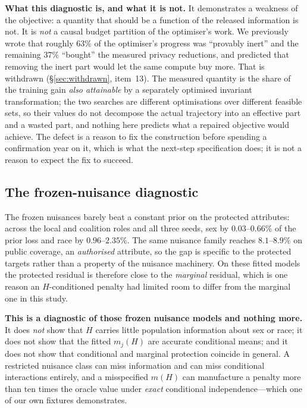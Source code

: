 \documentclass[10pt]{article}
\begin{document}
\textbf{What this diagnostic is, and what it is not.} It demonstrates a weakness of the objective:
a quantity that should be a function of the released information is not. It is \emph{not} a causal
budget partition of the optimiser's work. We previously wrote that roughly 63\% of the optimiser's
progress was ``provably inert'' and the remaining 37\% ``bought'' the measured privacy reductions,
and predicted that removing the inert part would let the same compute buy more. That is withdrawn
(\S\ref{sec:withdrawn}, item~13). The measured quantity is the share of the training gain
\emph{also attainable} by a separately optimised invariant transformation; the two searches are
different optimisations over different feasible sets, so their values do not decompose the actual
trajectory into an effective part and a wasted part, and nothing here predicts what a repaired
objective would achieve. The defect is a reason to fix the construction before spending a
confirmation year on it, which is what the next-step specification does; it is not a reason to
expect the fix to succeed.

\subsection{The frozen-nuisance diagnostic}

The frozen nuisances barely beat a constant prior on the protected attributes: across the local and
coalition roles and all three seeds, sex by $0.03$--$0.66\%$ of the prior loss and race by
$0.96$--$2.35\%$. The same nuisance family reaches $8.1$--$8.9\%$ on public coverage, an
\emph{authorised} attribute, so the gap is specific to the protected targets rather than a property
of the nuisance machinery. On these fitted models the protected residual is therefore close to the
\emph{marginal} residual, which is one reason an $H$-conditioned penalty had limited room to differ
from the marginal one in this study.

\textbf{This is a diagnostic of those frozen nuisance models and nothing more.} It does \emph{not}
show that $H$ carries little population information about sex or race; it does not show that the
fitted $m_j(H)$ are accurate conditional means; and it does not show that conditional and marginal
protection coincide in general. A restricted nuisance class can miss information and can miss
conditional interactions entirely, and a misspecified $m(H)$ can manufacture a penalty more than ten
times the oracle value under \emph{exact} conditional independence---which one of our own fixtures
demonstrates.
\end{document}
